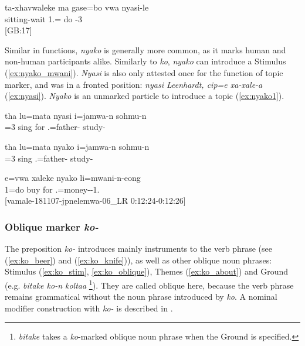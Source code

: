\ea\label{ex:si_nyasi2b}
\gll ta-xhavwaleke ma gase=bo vwa nyasi-le\\
 sitting-wait  1.= do -3\\
\glt {} {[GB:17]}
\z

Similar in functions, \textit{nyako} is generally more common, as it marks human and non-human participants alike. Similarly to \textit{ko}, \textit{nyako} can introduce a Stimulus (\ref{ex:nyako_mwani}). \textit{Nyasi} is also only attested once for the function of topic marker, and was in a fronted position: \textit{nyasi Leenhardt, cip=e xa-xale-a}  (\ref{ex:nyasi}). \textit{Nyako} is an unmarked particle to introduce a topic (\ref{ex:nyako1}).


\ea\label{ex:nyasi1}
\gll tha lu=mata nyasi i=jamwa-n sohmu-n\\
 =3 sing for .=father- study-\\
\glt {}
\z


\ea\label{ex:nyako1}
\gll tha lu=mata nyako i=jamwa-n sohmu-n\\
 =3 sing  .=father- study-\\
\glt {}
\z

\ea\label{ex:nyako_mwani}
\gll e=vwa xaleke nyako li=mwani-n-eong\\
 1=do buy for .=money--1.\\
\glt {} {[vamale-181107-jpnelemwa-06\_LR 0:12:24-0:12:26]}
\z

 
\subsubsection{Oblique marker \textit{ko-}}
\label{ssec:koon}

The preposition \textit{ko-} introduces mainly instruments to the verb phrase (see (\ref{ex:ko_beer}) and (\ref{ex:ko_knife})), as well as other oblique noun phrases: Stimulus (\ref{ex:ko_stim}, \ref{ex:ko_oblique}), Themes (\ref{ex:ko_about}) and Ground (e.g. \textit{bitake ko-n koltaa} \footnote{\textit{bitake}  takes a \textit{ko}-marked oblique noun phrase when the Ground is specified.}). They are called oblique here, because the verb phrase remains grammatical without the noun phrase introduced by \textit{ko}. A nominal modifier construction with \textit{ko-} is described in .


